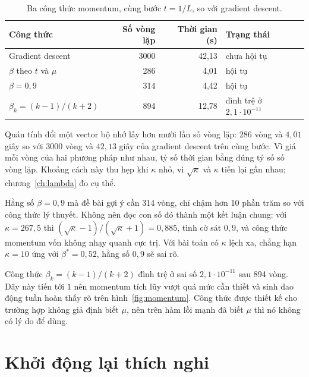 \documentclass[12pt, a4paper, oneside]{report}
\theoremstyle{definition}
\begin{document}
\begin{table}[tbp]
  \centering
  \caption{Ba công thức momentum, cùng bước $t = 1/L$, so với gradient descent.}
  \label{tab:momentum}
  \begin{tabular}{lrrl}
    \toprule
    Công thức & Số vòng lặp & Thời gian (s) & Trạng thái \\
    \midrule
    Gradient descent                        & 3000 & 42{,}13 & chưa hội tụ \\
    $\beta$ theo $t$ và $\mu$               & 286  & 4{,}01  & hội tụ \\
    $\beta = 0{,}9$                         & 314  & 4{,}42  & hội tụ \\
    $\beta_k = (k-1)/(k+2)$                 & 894  & 12{,}78 & đình trệ ở $2{,}1 \cdot 10^{-11}$ \\
    \bottomrule
  \end{tabular}
\end{table}

Quán tính đổi một vector bộ nhớ lấy hơn mười lần số vòng lặp: 286 vòng và
$4{,}01$ giây so với 3000 vòng và $42{,}13$ giây của gradient descent trên cùng
bước. Vì giá mỗi vòng của hai phương pháp như nhau, tỷ số thời gian bằng đúng tỷ
số số vòng lặp. Khoảng cách này thu hẹp khi $\kappa$ nhỏ, vì $\sqrt{\kappa}$ và
$\kappa$ tiến lại gần nhau; chương~\ref{ch:lambda} đo cụ thể.

Hằng số $\beta = 0{,}9$ mà đề bài gợi ý cần 314 vòng, chỉ chậm hơn 10 phần trăm
so với công thức lý thuyết. Không nên đọc con số đó thành một kết luận chung: với $\kappa = 267{,}5$ thì $(\sqrt{\kappa}-1)/(\sqrt{\kappa}+1) = 0{,}885$,
tình cờ sát $0{,}9$, và công thức momentum vốn không nhạy quanh cực trị. Với bài
toán có $\kappa$ lệch xa, chẳng hạn $\kappa = 10$ ứng với $\beta^{*} = 0{,}52$,
hằng số $0{,}9$ sẽ sai rõ.

Công thức $\beta_k = (k-1)/(k+2)$ đình trệ ở sai số $2{,}1 \cdot 10^{-11}$ sau
894 vòng. Dãy này tiến tới $1$ nên momentum tích lũy vượt quá mức cần thiết và
sinh dao động tuần hoàn thấy rõ trên hình~\ref{fig:momentum}. Công thức được
thiết kế cho trường hợp không giả định biết $\mu$, nên trên hàm lồi mạnh đã biết
$\mu$ thì nó không có lý do để dùng.


\section{Khởi động lại thích nghi}
\end{document}
